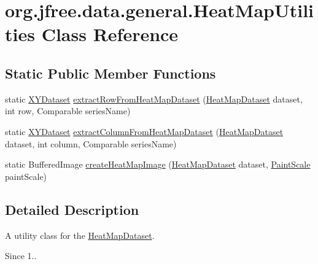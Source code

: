 \hypertarget{classorg_1_1jfree_1_1data_1_1general_1_1_heat_map_utilities}{}\section{org.\+jfree.\+data.\+general.\+Heat\+Map\+Utilities Class Reference}
\label{classorg_1_1jfree_1_1data_1_1general_1_1_heat_map_utilities}
\subsection*{Static Public Member Functions}
\begin{DoxyCompactItemize}
\item 
static \mbox{\hyperlink{interfaceorg_1_1jfree_1_1data_1_1xy_1_1_x_y_dataset}{X\+Y\+Dataset}} \mbox{\hyperlink{classorg_1_1jfree_1_1data_1_1general_1_1_heat_map_utilities_aaef17dd57b84cfe4536fac21f1be7734}{extract\+Row\+From\+Heat\+Map\+Dataset}} (\mbox{\hyperlink{interfaceorg_1_1jfree_1_1data_1_1general_1_1_heat_map_dataset}{Heat\+Map\+Dataset}} dataset, int row, Comparable series\+Name)
\item 
static \mbox{\hyperlink{interfaceorg_1_1jfree_1_1data_1_1xy_1_1_x_y_dataset}{X\+Y\+Dataset}} \mbox{\hyperlink{classorg_1_1jfree_1_1data_1_1general_1_1_heat_map_utilities_a9a6e5b4495cbd1c70183f2e164213967}{extract\+Column\+From\+Heat\+Map\+Dataset}} (\mbox{\hyperlink{interfaceorg_1_1jfree_1_1data_1_1general_1_1_heat_map_dataset}{Heat\+Map\+Dataset}} dataset, int column, Comparable series\+Name)
\item 
static Buffered\+Image \mbox{\hyperlink{classorg_1_1jfree_1_1data_1_1general_1_1_heat_map_utilities_a12f47a4ae043e6b1107325210d66d22f}{create\+Heat\+Map\+Image}} (\mbox{\hyperlink{interfaceorg_1_1jfree_1_1data_1_1general_1_1_heat_map_dataset}{Heat\+Map\+Dataset}} dataset, \mbox{\hyperlink{interfaceorg_1_1jfree_1_1chart_1_1renderer_1_1_paint_scale}{Paint\+Scale}} paint\+Scale)
\end{DoxyCompactItemize}


\subsection{Detailed Description}
A utility class for the \mbox{\hyperlink{interfaceorg_1_1jfree_1_1data_1_1general_1_1_heat_map_dataset}{Heat\+Map\+Dataset}}.

\begin{DoxySince}{Since}
1.. 
\end{DoxySince}


